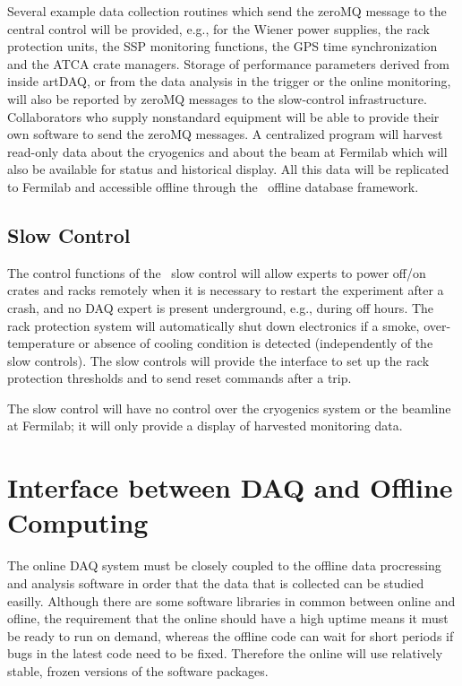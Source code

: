 Several example data collection routines which send the zeroMQ message
to the central control will be provided, e.g., for the Wiener power
supplies, the rack protection units, the SSP monitoring functions, the
GPS time synchronization and the ATCA crate managers.  Storage of
performance parameters derived from inside artDAQ, or from the data
analysis in the trigger or the online monitoring, will also be reported
by zeroMQ messages to the slow-control infrastructure.  Collaborators
who supply nonstandard equipment will be able to provide their own
software to send the zeroMQ messages.  A centralized program will
harvest read-only data about the cryogenics and about the beam at
Fermilab which will also be available for status and historical
display.  All this data will be replicated to Fermilab and accessible
offline through the \LBNE\ offline database framework.


\subsection{Slow Control}

The control functions of the \LBNE\ slow control will allow experts to
power off/on crates and racks remotely when it is necessary 
to restart the experiment after a crash, and no DAQ expert is present underground, e.g., during off hours.  The rack protection
system will automatically shut
down electronics if a smoke, over-temperature or absence of cooling
condition is detected  (independently of the slow controls).  The slow controls will provide the interface
to set up the rack protection thresholds and to send reset commands
after a trip.

The slow control will have no control over the cryogenics system or the beamline at Fermilab; it will only provide a display of harvested monitoring data.



\section{Interface between DAQ and Offline Computing}
\label{sec:daq_offline}


The online DAQ system must be closely coupled to the offline data
procressing and analysis software in order that the data that is
collected can be studied easilly.  Although there are some software
libraries in common between online and ofline, the requirement that
the online should have a high uptime means it must be ready to run on
demand, whereas the offline code can wait for short periods if bugs in
the latest code need to be fixed.  Therefore the online will use
relatively stable, frozen versions of the software packages.


